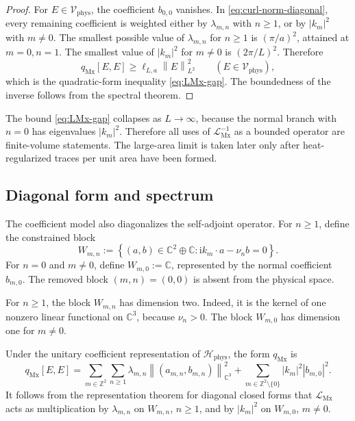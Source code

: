 \documentclass[11pt]{article}
\providecommand{\C}{\mathbb{C}}
\providecommand{\Z}{\mathbb{Z}}
\providecommand{\ii}{\mathrm{i}}
\providecommand{\abs}[1]{\left\lvert #1\right\rvert}
\providecommand{\norm}[1]{\left\lVert #1\right\rVert}
\providecommand{\set}[1]{\left\{#1\right\}}
\providecommand{\Hphys}{\mathcal H_{\mathrm{phys}}}
\providecommand{\Vphys}{\mathcal V_{\mathrm{phys}}}
\providecommand{\qMx}{q_{\mathrm{Mx}}}
\providecommand{\LMx}{\mathcal L_{\mathrm{Mx}}}
\numberwithin{equation}{section}
\begin{document}
\begin{proof}
For \(E\in\Vphys\), the coefficient \(b_{0,0}\) vanishes.  In \eqref{eq:curl-norm-diagonal}, every remaining coefficient is weighted either by \(\lambda_{m,n}\) with \(n\ge1\), or by \(\abs{k_m}^2\) with \(m\ne0\).  The smallest possible value of \(\lambda_{m,n}\) for \(n\ge1\) is \((\pi/a)^2\), attained at \(m=0,n=1\).  The smallest value of \(\abs{k_m}^2\) for \(m\ne0\) is \((2\pi/L)^2\).  Therefore
\[
    \qMx[E,E]
    \ge
    \ell_{L,a}\norm{E}_{L^2}^2
    \qquad(E\in\Vphys),
\]
which is the quadratic-form inequality \eqref{eq:LMx-gap}.  The boundedness of the inverse follows from the spectral theorem.
\end{proof}

\begin{remark}
\label{rem:finite-volume-essential}
The bound \eqref{eq:LMx-gap} collapses as \(L\to\infty\), because the normal branch with \(n=0\) has eigenvalues \(\abs{k_m}^2\).  Therefore all uses of \(\LMx^{-1}\) as a bounded operator are finite-volume statements.  The large-area limit is taken later only after heat-regularized traces per unit area have been formed.
\end{remark}

\subsection{Diagonal form and spectrum}
\label{subsec:diagonal-form-spectrum}

The coefficient model also diagonalizes the self-adjoint operator.  For \(n\ge1\), define the constrained block
\begin{equation}
\label{eq:Wmn-block-def}
    W_{m,n}
    :=
    \set{(a,b)\in\C^2\oplus\C:
          \ii k_m\cdot a-\nu_n b=0} .
\end{equation}
For \(n=0\) and \(m\ne0\), define \(W_{m,0}:=\C\), represented by the normal coefficient \(b_{m,0}\).  The removed block \((m,n)=(0,0)\) is absent from the physical space.

For \(n\ge1\), the block \(W_{m,n}\) has dimension two.  Indeed, it is the kernel of one nonzero linear functional on \(\C^3\), because \(\nu_n>0\).  The block \(W_{m,0}\) has dimension one for \(m\ne0\).

Under the unitary coefficient representation of \(\Hphys\), the form \(\qMx\) is
\begin{equation}
\label{eq:qMx-block-diagonal}
    \qMx[E,E]
    =
    \sum_{m\in\Z^2}\sum_{n\ge1}
    \lambda_{m,n}\norm{(a_{m,n},b_{m,n})}_{\C^3}^2
    +
    \sum_{m\in\Z^2\setminus\{0\}}
    \abs{k_m}^2\abs{b_{m,0}}^2 .
\end{equation}
It follows from the representation theorem for diagonal closed forms that \(\LMx\) acts as multiplication by \(\lambda_{m,n}\) on \(W_{m,n}\), \(n\ge1\), and by \(\abs{k_m}^2\) on \(W_{m,0}\), \(m\ne0\).
\end{document}
